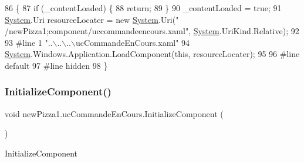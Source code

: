 \begin{DoxyCode}
86                                           \{
87             \textcolor{keywordflow}{if} (\_contentLoaded) \{
88                 \textcolor{keywordflow}{return};
89             \}
90             \_contentLoaded = \textcolor{keyword}{true};
91             \hyperlink{namespaceSystem}{System}.Uri resourceLocater = \textcolor{keyword}{new} \hyperlink{namespaceSystem}{System}.Uri(\textcolor{stringliteral}{"
      /newPizza1;component/uccommandeencours.xaml"}, \hyperlink{namespaceSystem}{System}.UriKind.Relative);
92             
93 \textcolor{preprocessor}{            #line 1 "..\(\backslash\)..\(\backslash\)..\(\backslash\)ucCommandeEnCours.xaml"}
94             \hyperlink{namespaceSystem}{System}.Windows.Application.LoadComponent(\textcolor{keyword}{this}, resourceLocater);
95             
96 \textcolor{preprocessor}{            #line default}
97 \textcolor{preprocessor}{            #line hidden}
98         \}
\end{DoxyCode}
\mbox{\label{classnewPizza1_1_1ucCommandeEnCours_a5838b3aa1f180eda285120814af5dadd}} 
\subsubsection{\texorpdfstring{Initialize\+Component()}{InitializeComponent()}\hspace{0.1cm}{\footnotesize\ttfamily [5/6]}}
{\footnotesize\ttfamily void new\+Pizza1.\+uc\+Commande\+En\+Cours.\+Initialize\+Component (\begin{DoxyParamCaption}{ }\end{DoxyParamCaption})\hspace{0.3cm}{\ttfamily [inline]}}



Initialize\+Component 


